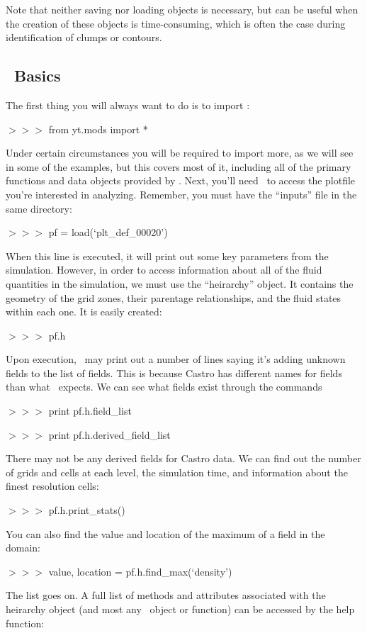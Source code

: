 Note that neither saving nor loading objects is necessary, but can be
useful when the creation of these objects is time-consuming, which is
often the case during identification of clumps or contours.

\subsection{\yt\ Basics}

The first thing you will always want to do is to import \yt:

{{\scriptsize$>>>$}} from yt.mods import *

Under certain circumstances you will be required to import more, as we
will see in some of the examples, but this covers most of it,
including all of the primary functions and data objects provided by
\yt. Next, you'll need \yt\ to access the plotfile you're interested in
analyzing. Remember, you must have the ``inputs'' file in the same
directory:

{\scriptsize$>>>$} pf = load(`plt\_def\_00020')

When this line is executed, it will print out some key parameters from
the simulation. However, in order to access information about all of
the fluid quantities in the simulation, we must use the ``heirarchy''
object. It contains the geometry of the grid zones, their parentage
relationships, and the fluid states within each one. It is easily
created:

{\scriptsize$>>>$} pf.h

Upon execution, \yt\ may print out a number of lines saying it's adding
unknown fields to the list of fields. This is because Castro has
different names for fields than what \yt\ expects. We can see what
fields exist through the commands

{\scriptsize$>>>$} print pf.h.field\_list

{\scriptsize$>>>$} print pf.h.derived\_field\_list

There may not be any derived fields for Castro data. We can find out
the number of grids and cells at each level, the simulation time, and
information about the finest resolution cells:

{\scriptsize$>>>$} pf.h.print\_stats()

You can also find the value and location of the maximum of a field in
the domain:

{\scriptsize$>>>$} value, location = pf.h.find\_max(`density')

The list goes on. A full list of methods and attributes associated
with the heirarchy object (and most any \yt\ object or function) can be
accessed by the help function:

